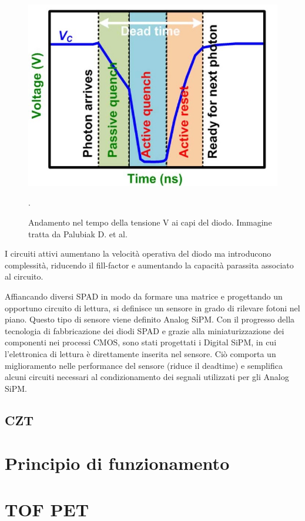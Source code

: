 \begin{figure}[tbh]
	\centering
	\includegraphics[width=0.6\linewidth]{./ImageFiles/aqr_2.jpg}
	\caption{Andamento nel tempo della tensione V ai capi del diodo. Immagine tratta da Palubiak D. et al. \cite{Palubiak2011}}. 
	\label{fig:aqr_2}
\end{figure} 
I circuiti attivi aumentano la velocità operativa del diodo ma introducono complessità, riducendo il fill-factor e aumentando la capacità parassita associato al circuito.

Affiancando diversi SPAD in modo da formare una matrice e progettando un opportuno circuito di lettura, si definisce un sensore in grado di rilevare fotoni nel piano. Questo tipo di sensore viene definito Analog SiPM. Con il progresso della tecnologia di fabbricazione dei diodi SPAD e grazie alla miniaturizzazione dei componenti nei processi CMOS, sono stati progettati i Digital SiPM, in cui l'elettronica di lettura è direttamente inserita nel sensore. Ciò comporta un miglioramento nelle performance del sensore (riduce il deadtime) e semplifica alcuni circuiti necessari al condizionamento dei segnali utilizzati per gli Analog SiPM.

\clearpage
\subsection{CZT}

\clearpage
\section{Principio di funzionamento}

\clearpage
\section{TOF PET}